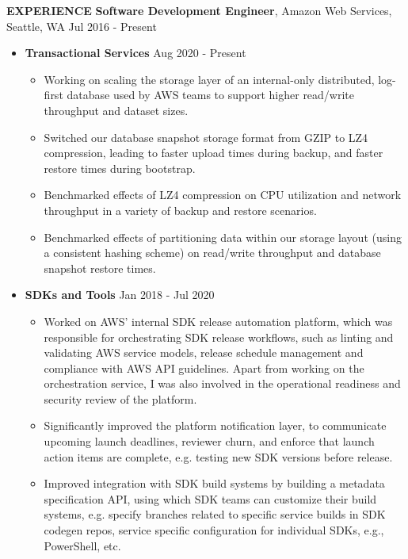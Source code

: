 \documentclass[10pt, a4paper]{article}
\begin{document}
\textbf{EXPERIENCE}
\smallskip
\newline
\textbf{Software Development Engineer}, Amazon Web Services, Seattle, WA \hfill Jul 2016 - Present
\begin{itemize}
\item \textbf{Transactional Services} \hfill Aug 2020 - Present
  \begin{itemize}[label=$\bullet$]
  \item Working on scaling the storage layer of an internal-only distributed, log-first database used by AWS teams to support higher read/write throughput and dataset sizes.
  \item Switched our database snapshot storage format from GZIP to LZ4 compression, leading to faster upload times during backup, and faster restore times during bootstrap.    
  \item Benchmarked effects of LZ4 compression on CPU utilization and network throughput in a variety of backup and restore scenarios.
  \item Benchmarked effects of partitioning data within our storage layout (using a consistent hashing scheme) on read/write throughput and database snapshot restore times.
  \end{itemize}
\item \textbf{SDKs and Tools} \hfill Jan 2018 - Jul 2020
  \begin{itemize}[label=$\bullet$]
  \item Worked on AWS' internal SDK release automation platform, which was responsible for orchestrating SDK release workflows, such as linting and validating AWS service models, release schedule management and compliance with AWS API guidelines. Apart from working on the orchestration service, I was also involved in the operational readiness and security review of the platform.
  \item Significantly improved the platform notification layer, to communicate upcoming launch deadlines, reviewer churn, and enforce that launch action items are complete, e.g. testing new SDK versions before release.
  \item Improved integration with SDK build systems by building a metadata specification API, using which SDK teams can customize their build systems, e.g. specify branches related to specific service builds in SDK codegen repos, service specific configuration for individual SDKs, e.g., PowerShell, etc.

\end{itemize}
\end{itemize}
\end{document}
